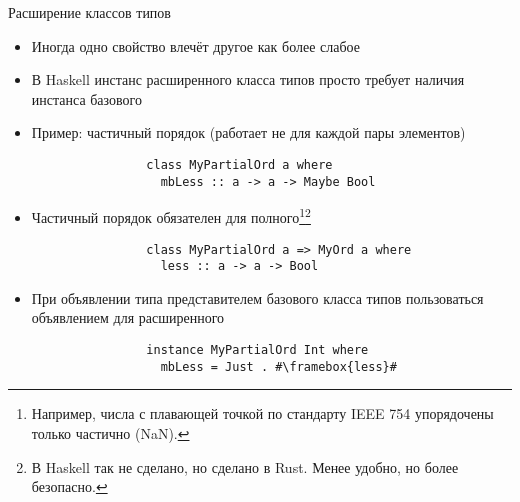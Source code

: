     \begin{frame}[fragile]{Расширение классов типов}
        \begin{itemize}
            \item Иногда одно свойство влечёт другое как более слабое
            \item В Haskell инстанс расширенного класса типов  просто требует наличия инстанса базового
            \item Пример: частичный порядок (работает не для каждой пары элементов)
            \begin{verbatim}
                class MyPartialOrd a where
                  mbLess :: a -> a -> Maybe Bool
            \end{verbatim}
            \item Частичный порядок обязателен для полного\footnote{Например, числа с плавающей точкой по стандарту IEEE 754 упорядочены только частично (NaN).}\footnote{В Haskell так не сделано, но сделано в Rust. Менее удобно, но более безопасно.}
            \begin{verbatim}
                class MyPartialOrd a => MyOrd a where
                  less :: a -> a -> Bool
            \end{verbatim}
            \item При объявлении типа представителем базового класса типов пользоваться объявлением для расширенного
            \begin{verbatim}
                instance MyPartialOrd Int where
                  mbLess = Just . #\framebox{less}#
            \end{verbatim}
        \end{itemize}
    \end{frame}


    \appendix

